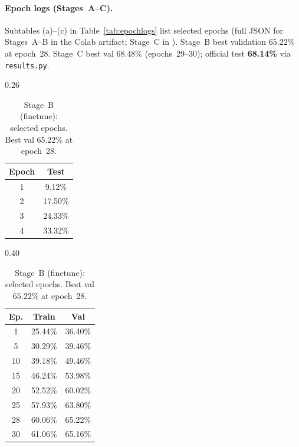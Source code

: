 \documentclass[11pt,a4paper]{article}
\begin{document}
\paragraph{Epoch logs (Stages~A--C).}
Subtables (a)--(c) in Table~\ref{tab:epochlogs} list selected epochs (full JSON for Stages~A--B in the Colab artifact; Stage~C in ). Stage~B best validation $65.22\%$ at epoch~28. Stage~C best val $68.48\%$ (epochs~29--30); official test \textbf{68.14\%} via \texttt{results.py}.

\begin{table}[H]
    \centering
    \footnotesize
    \setlength{\tabcolsep}{3pt}
    \begin{subtable}[t]{0.26\textwidth}
        \centering
        \caption{Stage~A (baseline): test accuracy per epoch.}
        \label{tab:logA}
        \begin{tabular}{@{}cc@{}}
            \toprule
            Epoch & Test \\
            \midrule
            1 & 9.12\% \\
            2 & 17.50\% \\
            3 & 24.33\% \\
            4 & 33.32\% \\
            \bottomrule
        \end{tabular}
    \end{subtable}
    \hfill
    \begin{subtable}[t]{0.40\textwidth}
        \centering
        \caption{Stage~B (finetune): selected epochs. Best val $65.22\%$ at epoch~28.}
        \label{tab:logB}
        \begin{tabular}{@{}ccc@{}}
            \toprule
            Ep. & Train & Val \\
            \midrule
            1 & 25.44\% & 36.40\% \\
            5 & 30.29\% & 39.46\% \\
            10 & 39.18\% & 49.46\% \\
            15 & 46.24\% & 53.98\% \\
            20 & 52.52\% & 60.02\% \\
            25 & 57.93\% & 63.80\% \\
            28 & 60.06\% & 65.22\% \\
            30 & 61.06\% & 65.16\% \\
            \bottomrule
        \end{tabular}
    \end{subtable}

\end{table}
\end{document}
